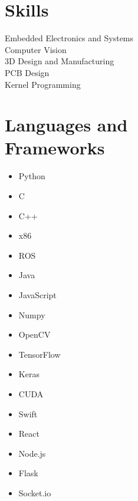 \documentclass[]{deedy-resume-openfont}
\begin{document}
\begin{minipage}[t]{0.33\textwidth}

\section{Skills}
Embedded Electronics and Systems \\
Computer Vision \\
3D Design and Manufacturing \\
PCB Design \\
Kernel Programming \\


\section{Languages and \\ Frameworks}
\begin{itemize}[nosep, wide=0pt, leftmargin=*, after=\strut]
\item Python
\item C
\item C++
\item x86
\item ROS
\end{itemize} 
\begin{itemize}[nosep, wide=0pt, leftmargin=*, after=\strut]
\item Java
\item JavaScript
\item Numpy
\item OpenCV
\item TensorFlow
\item Keras
\item CUDA
\end{itemize} 
\begin{itemize}[nosep, wide=0pt, leftmargin=*, after=\strut]
\item Swift
\item React
\item Node.js
\item Flask
\item Socket.io
\end{itemize} 
\sectionsep



\sectionsep

%
%

\end{minipage} 
\end{document}
